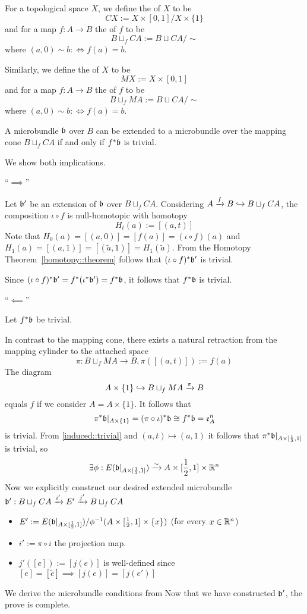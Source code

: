 
For a topological space $X$, we define the  of $X$ to be 
\[ CX := X \times [0, 1] / X \times \{1\} \]
and for a map $f: A \to B$ the  of $f$ to be
\[ B \sqcup_f CA := B \sqcup CA / \sim \]
where $(a, 0) \sim b :\iff f(a) = b$.

Similarly, we define the  of $X$ to be
\[ MX := X \times [0, 1] \]
and for a map $f: A \to B$ the  of $f$ to be
\[ B \sqcup_f MA := B \sqcup CA / \sim \]
where $(a, 0) \sim b :\iff f(a) = b$.

\begin{mylemma}
A microbundle $\bb$ over $B$ can be extended to a microbundle over the mapping cone $B \sqcup_f CA$ if and only if $f^*\bb$ is trivial.
\end{mylemma}
\begin{myproof}
We show both implications.

``$\implies$''

Let $\bb'$ be an extension of $\bb$ over $B \sqcup_f CA$.
Considering $A \xto{f} B \incl B \sqcup_f CA$, the composition $\iota \circ f$ is null-homotopic with homotopy
\[ H_t(a) := [(a, t)] \]
Note that $H_0(a) = [(a, 0)] = [f(a)] = (\iota \circ f)(a)$ and $H_1(a) = [(a, 1)] = [(\tilde{a}, 1)] = H_1(\tilde{a})$.
From the Homotopy Theorem~\ref{homotopy::theorem} follows that $(\iota \circ f)^*\bb'$ is trivial. 

Since $(\iota \circ f)^*\bb' = f^*(\iota^*\bb') = f^*\bb$, it follows that $f^*\bb$ is trivial.

``$\impliedby$''

Let $f^*\bb$ be trivial.

In contrast to the mapping cone, there exists a natural retraction from the mapping cylinder to the attached space
\[ \pi: B \sqcup_f MA \to B, \pi([(a, t)]) := f(a) \]
The diagram
\[ A \times \{1\} \incl B \sqcup_f MA \xto{\pi} B \]
equals $f$ if we consider $A = A \times \{1\}$.
It follows that
\[ \pi^*\bb\restr{A \times \{1\}} = (\pi \circ \iota)^*\bb \cong f^*\bb = \mathfrak{e}^n_A\]
is trivial.
From \cref{induced::trivial} and $(a, t) \mapsto (a, 1)$ it follows that $\pi^*\bb\restr{A \times [\frac{1}{2}, 1]}$ is trivial, so
\[ \exists \phi: E(\bb\restr{A \times [\frac{1}{2}, 1]}) \isomto A \times [\frac{1}{2}, 1] \times \R^n \]
Now we explicitly construct our desired extended microbundle $\bundledef{\bb'}{B \sqcup_f CA}{E'}{i'}{j'}$
\begin{itemize}
    \item $E' := E(\bb\restr{A \times [\frac{1}{2}, 1]}) / \phi^{-1}(A \times [\frac{1}{2}, 1] \times \{x\})$ (for every $x \in \R^n$)
    \item $i' := \pi \circ i$ the projection map.
    \item $j'([e]) := [j(e)]$ is well-defined since $[e] = [\tilde{e}] \implies [j(e)] = [j(e')]$
\end{itemize}
We derive the microbundle conditions from 
Now that we have constructed $\bb'$, the prove is complete.
\end{myproof}